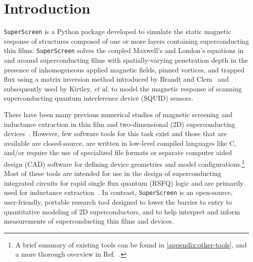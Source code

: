 \documentclass[final,3p,times]{elsarticle}
\newcommand{\inline}[1]{\texttt{#1}\xspace}
\newcommand{\SuperScreen}{\inline{SuperScreen}}
\begin{document}
\begin{small}
\end{small}


\section{Introduction}
\label{section:introduction}

\SuperScreen is a Python package developed to simulate the static magnetic response of structures composed of one or more layers containing superconducting thin films. \SuperScreen solves the coupled Maxwell's and London's equations in and around superconducting films with spatially-varying penetration depth in the presence of inhomogeneous applied magnetic fields, pinned vortices, and trapped flux using a matrix inversion method introduced by Brandt and Clem~\cite{Brandt2004-ew,Brandt2005-wj} and subsequently used by Kirtley, \emph{et al.} to model the magnetic response of scanning superconducting quantum interference device (SQUID) sensors.~\cite{Kirtley2016-zz, Kirtley2016-gt}

There have been many previous numerical studies of magnetic screening and inductance extraction in thin film and two-dimensional (2D) superconducting devices~\cite{Jaycox1981-zl, Ketchen1982-at, Ketchen2012-mb, Hildebrandt1995-uw, Khapaev1997-kw, Khapaev2001-xq, Khapaev2001-pw, Babaei_Brojeny2003-la, Brandt2004-ew, Brandt2005-wj, Clem2005-ye, Muller2021-ci, Jackman2016-mf}. However, few software tools for this task exist and those that are available are closed-source, are written in low-level compiled languages like C, and/or require the use of specialized file formats or separate computer aided design (CAD) software for defining device geometries and model configurations.\footnote{A brief summary of existing tools can be found in \ref{appendix:other-tools}, and a more thorough overview in Ref.~\cite{Gaj1999-ls}.} Most of these tools are intended for use in the design of superconducting integrated circuits for rapid single flux quantum (RSFQ) logic and are primarily used for inductance extraction~\cite{Gaj1999-ls}. In contrast, \SuperScreen is an open-source, user-friendly, portable research tool designed to lower the barrier to entry to quantitative modeling of 2D superconductors, and to help interpret and inform measurements of superconducting thin films and devices.
\end{document}
